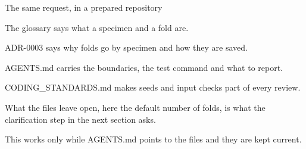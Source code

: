 \begin{frame}{The same request, in a prepared repository}
{    The glossary says what a specimen and a fold are.\par
    ADR-0003 says why folds go by specimen and how they are saved.\par
    AGENTS.md carries the boundaries, the test command and what to report.\par
    CODING\_STANDARDS.md makes seeds and input checks part of every review.\par
    What the files leave open, here the default number of folds, is what the clarification step
      in the next section asks.\par
    This works only while AGENTS.md points to the files and they are kept current.}
\end{frame}
